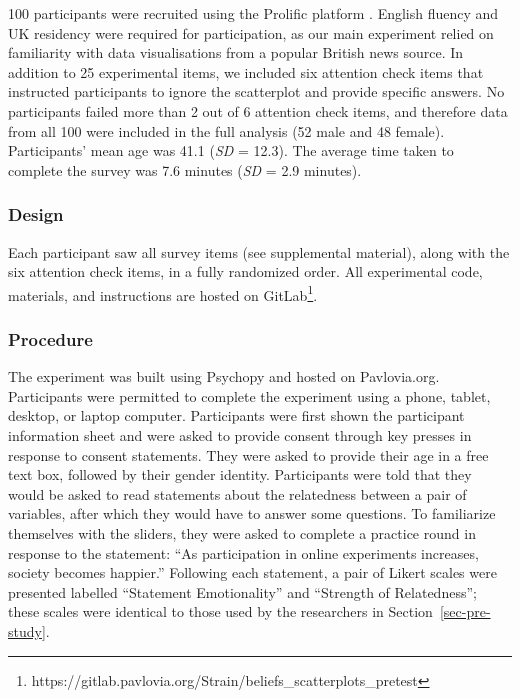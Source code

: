 \documentclass[sigconf]{acmart}
\begin{document}
100 participants were recruited using the Prolific platform
\citep{prolific}. English fluency and UK residency were required for
participation, as our main experiment relied on familiarity with data
visualisations from a popular British news source. In addition to 25
experimental items, we included six attention check items that
instructed participants to ignore the scatterplot and provide specific
answers. No participants failed more than 2 out of 6 attention check
items, and therefore data from all 100 were included in the full
analysis (52 male and 48 female). Participants' mean age was 41.1
(\emph{SD} = 12.3). The average time taken to complete the survey was
7.6 minutes (\emph{SD} = 2.9 minutes).

\subsubsection{Design}\label{sec-design-pre}

Each participant saw all survey items (see supplemental material), along
with the six attention check items, in a fully randomized order. All
experimental code, materials, and instructions are hosted on
GitLab\footnote{https://gitlab.pavlovia.org/Strain/beliefs\_scatterplots\_pretest}.

\subsubsection{Procedure}\label{sec-procedure-pre}

The experiment was built using Psychopy \citep{pierce_2019} and hosted
on Pavlovia.org. Participants were permitted to complete the experiment
using a phone, tablet, desktop, or laptop computer. Participants were
first shown the participant information sheet and were asked to provide
consent through key presses in response to consent statements. They were
asked to provide their age in a free text box, followed by their gender
identity. Participants were told that they would be asked to read
statements about the relatedness between a pair of variables, after
which they would have to answer some questions. To familiarize
themselves with the sliders, they were asked to complete a practice
round in response to the statement: ``As participation in online
experiments increases, society becomes happier.'' Following each
statement, a pair of Likert scales were presented labelled ``Statement
Emotionality'' and ``Strength of Relatedness''; these scales were
identical to those used by the researchers in
Section~\ref{sec-pre-study}.
\end{document}
